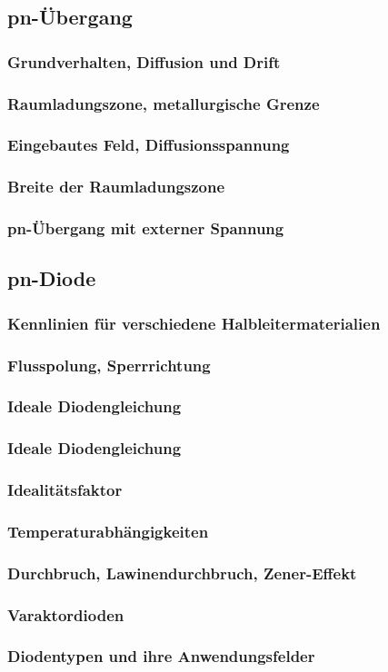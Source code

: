 
\subsection{pn-Übergang}
	\subsubsection{Grundverhalten, Diffusion und Drift}
	\subsubsection{Raumladungszone, metallurgische Grenze}
	\subsubsection{Eingebautes Feld, Diffusionsspannung}
	\subsubsection{Breite der Raumladungszone}
	\subsubsection{pn-Übergang mit externer Spannung}
\subsection{pn-Diode}
	\subsubsection{Kennlinien für verschiedene Halbleitermaterialien}
	\subsubsection{Flusspolung, Sperrrichtung}
	\subsubsection{Ideale Diodengleichung}
	\subsubsection{Ideale Diodengleichung}
	\subsubsection{Idealitätsfaktor}
	\subsubsection{Temperaturabhängigkeiten}
	\subsubsection{Durchbruch, Lawinendurchbruch, Zener-Effekt}
	\subsubsection{Varaktordioden}
	\subsubsection{Diodentypen und ihre Anwendungsfelder}


